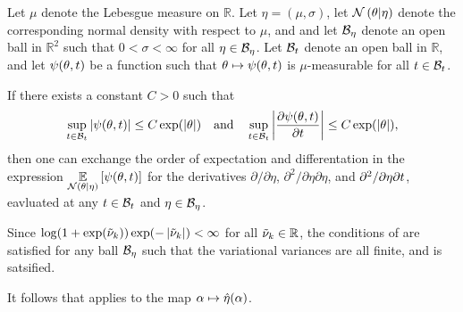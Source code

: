 \begin{lem}
%
Let $\mu$ denote the Lebesgue measure on $\mathbb{R}$. Let $\eta = (\mu,
\sigma)$, let $\mathcal{N}\left(\theta \vert \eta\right)$ denote the corresponding normal
density with respect to $\mu$, and and let $\mathcal{B}_\eta$ denote an open ball in
$\mathbb{R}^2$ such that $0 < \sigma < \infty$ for all $\eta \in \mathcal{B}_\eta$.
%
Let $\mathcal{B}_t$ denote an open ball in $\mathbb{R}$, and let $\psi(\theta, t)$
be a function such that $\theta \mapsto \psi(\theta, t)$ is $\mu$-measurable
for all $t \in \mathcal{B}_t$.

If there exists a constant $C > 0$ such that
%
\begin{align*}
%
\sup_{\t \in \ball_\t} \abs{\psi(\theta, \t)}
    \le C \exp(\abs{\theta})
\mathand
\sup_{\t \in \ball_\t}
    \abs{\frac{\partial \psi(\theta, \t)}{\partial \t}}
    \le C \exp(\abs{\theta}),
%
\end{align*}
%
then one can exchange the order of expectation and differentation in the
expression $\underset{\mathcal{N}\left(\theta \vert \eta\right)}{\mathbb{E}}\left[\psi(\theta, t)\right]$ for the
derivatives $\partial / \partial \eta$, $\partial^2 / \partial \eta \partial
\eta$, and $\partial^2 / \partial \eta  \partial t$, eavluated at any $t \in
\mathcal{B}_t$ and $\eta \in \mathcal{B}_\eta$.

\end{lem}

Since $\log (1 + \exp(\tilde{\nu}_{k})) \exp(-\left|\tilde{\nu}_{k}\right|)  < \infty$ for all $\tilde{\nu}_{k} \in
\mathbb{R}$, the conditions of  are satisfied for
any ball $\mathcal{B}_\eta$ such that the variational variances are all finite, and
 is satsified.

It follows that  applies to the map $\alpha \mapsto
\hat\eta(\alpha)$.
